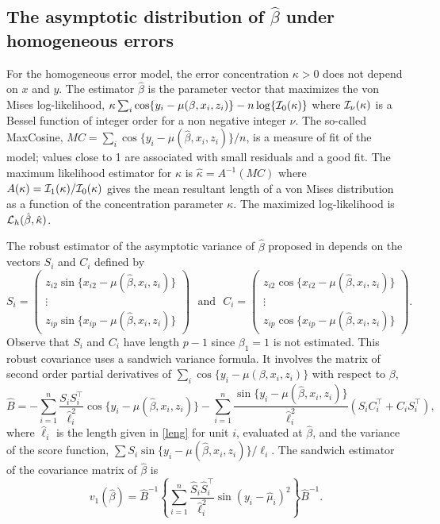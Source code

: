 \subsection{The asymptotic distribution of $\hat \beta$ under homogeneous errors}

For the homogeneous error model, the error concentration $\kappa>0$ does not depend on $x$ and $y$.  The estimator $\hat \beta$ is the parameter vector that maximizes the von Mises log-likelihood, $\kappa\sum_i\cos\{y_i- \mu(\beta,x_i,z_i)\}-n\log\{{\cal I}_0(\kappa)\}$ where ${\cal I}_\nu(\kappa)$ is a Bessel function of integer order for a non negative integer $\nu$.  The so-called MaxCosine, $MC=\sum_i\cos\{y_i- \mu(\hat \beta,x_i,z_i)\}/n$, is a measure of fit of the model; values close to 1 are associated with small residuals and a good fit. The  maximum likelihood estimator for $\kappa$ is $\hat \kappa=A^{-1}(MC)$ where $A(\kappa)={\cal I}_1(\kappa)/{\cal I}_0(\kappa)$  gives the mean resultant length of a von Mises distribution as a function of the concentration parameter $\kappa$.  The maximized log-likelihood is ${\cal L}_h(\hat \beta, \hat \kappa)$.

The robust estimator of the asymptotic variance of $\hat \beta$ proposed in \citet{Rivest16} depends on the vectors $S_i$ and $C_i$ defined by
$$
S_i=\begin{pmatrix} z_{i2}\sin\{x_{i2}-\mu(\hat \beta,x_i,z_i)\}\\ \vdots \\ z_{ip}\sin\{x_{ip}-\mu(\hat\beta,x_i,z_i)\}\end{pmatrix} \mbox{~~and~~}
C_i=\begin{pmatrix} z_{i2}\cos\{x_{i2}-\mu(\hat\beta,x_i,z_i)\}\\ \vdots \\ z_{ip}\cos\{x_{ip}-\mu(\hat \beta,x_i,z_i)\}\end{pmatrix} .
$$
Observe that $S_i$ and $C_i$ have length $p-1$ since $\beta_1=1$ is not estimated. This robust covariance uses a sandwich variance formula.  It involves the matrix of second order partial derivatives of $\sum_i\cos\{y_i- \mu(\beta,x_i,z_i)\}$ with respect to $\beta$,
\begin{equation}\label{hata}
\hat  B= - \sum_{i=1}^n \frac{S_iS_i^\top}{\hat \ell_i^2} \cos\{y_i-\mu(\hat \beta,x_i,z_i)\}  - \sum_{i=1}^n \frac {\sin\{y_i-\mu(\hat \beta,x_i,z_i)\}}{\hat \ell_i^2} \left ( S_iC_i^\top+C_iS_i^\top\right),
\end{equation}
where $\hat \ell_i$  is the length given in \eqref{leng} for unit  $i$, evaluated at $\hat \beta$,  and the variance of the score function, $\sum S_i \sin\{y_i-\mu(\hat \beta,x_i,z_i)\} /\ell_i$. The sandwich estimator of the covariance matrix of $\hat \beta$ is
\begin{equation}\label{v1}
v_1(\hat \beta)=\hat B^{-1} \left\{ \sum_{i=1}^n \frac{\hat S_i \hat S_i^\top}{\hat \ell_i^2} \sin(y_i-\hat \mu_i)^2 \right\} \hat B^{-1}.
\end{equation}

